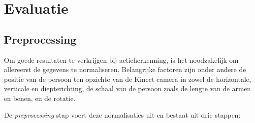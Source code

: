\chapter{Evaluatie}

\section{Preprocessing}
Om goede resultaten te verkrijgen bij actieherkenning, is het noodzakelijk om allereerst de gegevens te normaliseren. Belangrijke factoren zijn onder andere de positie van de persoon ten opzichte van de Kinect camera in zowel de horizontale, verticale en diepterichting, de schaal van de persoon zoals de lengte van de armen en benen, en de rotatie. 

De \textit{preprocessing} stap voert deze normalisaties uit en bestaat uit drie stappen:
